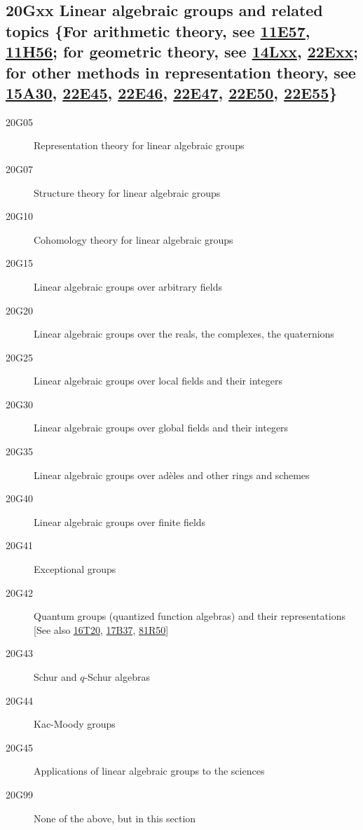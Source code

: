 \subsection*{20Gxx  Linear algebraic groups and related topics \{For arithmetic theory, see \hyperref[11E57]{11E57}, \hyperref[11H56]{11H56}; for geometric theory, see \hyperref[14Lxx]{14Lxx}, \hyperref[22Exx]{22Exx}; for other methods in representation theory, see \hyperref[15A30]{15A30}, \hyperref[22E45]{22E45}, \hyperref[22E46]{22E46}, \hyperref[22E47]{22E47}, \hyperref[22E50]{22E50}, \hyperref[22E55]{22E55}\} }\label{20Gxx}
\begin{description}  
\item [20G05]\label{20G05} Representation theory for linear algebraic groups
\item [20G07]\label{20G07} Structure theory for linear algebraic groups
\item [20G10]\label{20G10} Cohomology theory for linear algebraic groups
\item [20G15]\label{20G15} Linear algebraic groups over arbitrary fields
\item [20G20]\label{20G20} Linear algebraic groups over the reals, the complexes, the quaternions
\item [20G25]\label{20G25} Linear algebraic groups over local fields and their integers
\item [20G30]\label{20G30} Linear algebraic groups over global fields and their integers
\item [20G35]\label{20G35} Linear algebraic groups over ad\`{e}les and other rings and schemes
\item [20G40]\label{20G40} Linear algebraic groups over finite fields
\item [20G41]\label{20G41} Exceptional groups
\item [20G42]\label{20G42} Quantum groups (quantized function algebras) and their representations [See also \hyperref[16T20]{16T20}, \hyperref[17B37]{17B37}, \hyperref[81R50]{81R50}]
\item [20G43]\label{20G43} Schur and $q$-Schur algebras
\item [20G44]\label{20G44} Kac-Moody groups
\item [20G45]\label{20G45} Applications of linear algebraic groups to the sciences
\item [20G99]\label{20G99} None of the above, but in this section
\end{description}
